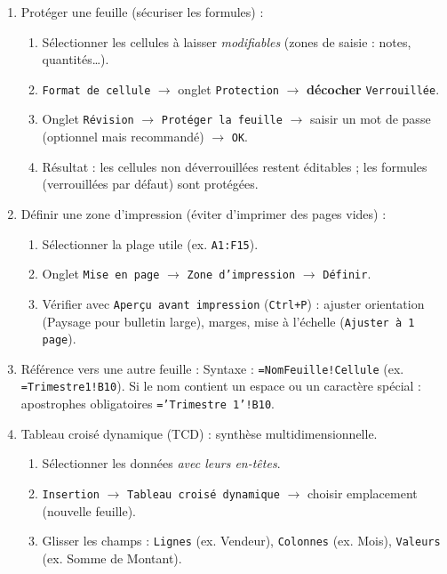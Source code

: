 \documentclass[11pt]{article}
\newcommand{\cle}[1]{{\popxbold\color{popdark}#1}}
\begin{document}
\begin{methode}
\begin{enumerate}
\item \cle{Protéger une feuille} (sécuriser les formules) :
\begin{enumerate}
\item Sélectionner les cellules à laisser \emph{modifiables} (zones de saisie : notes, quantités\ldots).
\item \texttt{Format de cellule} $\rightarrow$ onglet \texttt{Protection} $\rightarrow$ \textbf{décocher} \texttt{Verrouillée}.
\item Onglet \texttt{Révision} $\rightarrow$ \texttt{Protéger la feuille} $\rightarrow$ saisir un mot de passe (optionnel mais recommandé) $\rightarrow$ \texttt{OK}.
\item Résultat : les cellules non déverrouillées restent éditables ; les formules (verrouillées par défaut) sont protégées.
\end{enumerate}
\item \cle{Définir une zone d'impression} (éviter d'imprimer des pages vides) :
\begin{enumerate}
\item Sélectionner la plage utile (ex. \texttt{A1:F15}).
\item Onglet \texttt{Mise en page} $\rightarrow$ \texttt{Zone d'impression} $\rightarrow$ \texttt{Définir}.
\item Vérifier avec \texttt{Aperçu avant impression} (\texttt{Ctrl+P}) : ajuster orientation (Paysage pour bulletin large), marges, mise à l'échelle (\texttt{Ajuster à 1 page}).
\end{enumerate}
\item \cle{Référence vers une autre feuille} :
Syntaxe : \texttt{=NomFeuille!Cellule} (ex. \texttt{=Trimestre1!B10}).
Si le nom contient un espace ou un caractère spécial : apostrophes obligatoires \texttt{='Trimestre 1'!B10}.
\item \cle{Tableau croisé dynamique (TCD)} : synthèse multidimensionnelle.
\begin{enumerate}
\item Sélectionner les données \emph{avec leurs en-têtes}.
\item \texttt{Insertion} $\rightarrow$ \texttt{Tableau croisé dynamique} $\rightarrow$ choisir emplacement (nouvelle feuille).
\item Glisser les champs : \texttt{Lignes} (ex. Vendeur), \texttt{Colonnes} (ex. Mois), \texttt{Valeurs} (ex. Somme de Montant).
\end{enumerate}
\end{enumerate}
\end{methode}
\end{document}
